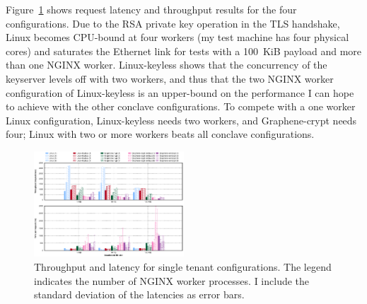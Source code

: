 Figure~\ref{fig:macrobench-single-tenant-lat-throughput} shows
request latency and throughput results for the four configurations.
%
Due to the RSA private key operation in the TLS handshake, Linux becomes
CPU-bound at four workers (my test machine has four physical cores) and
saturates the Ethernet link for tests with a 100~KiB payload and more than one
NGINX worker.
%
Linux-keyless shows that the concurrency of the keyserver levels
off with two workers, and thus that the two NGINX worker configuration of
Linux-keyless is an upper-bound on the performance I can hope to achieve
with the other conclave configurations.
%
%
To compete with a one worker Linux configuration, Linux-keyless needs two
workers, and Graphene-crypt needs four; Linux with two or more workers beats
all conclave configurations.


\begin{figure}[t]
	\centering
    \includegraphics[width=0.5\textwidth]{figs/macrobench-single-tenant-lat-throughput}
	\caption{Throughput and latency for single tenant configurations.
    The legend indicates the number of NGINX worker processes.
    I include the standard deviation of the latencies as error bars.}
	\vspace*{-4pt}
    \label{fig:macrobench-single-tenant-lat-throughput}
\end{figure}
